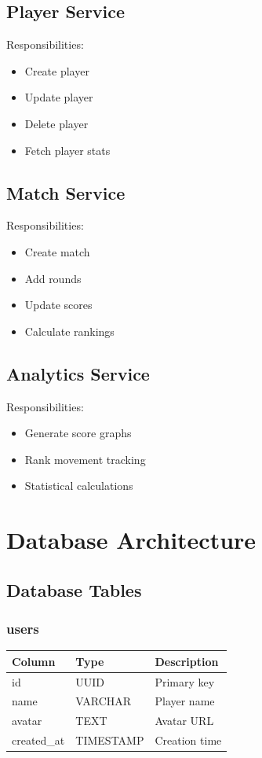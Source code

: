\documentclass[11pt,a4paper]{article}
\begin{document}
\subsection{Player Service}
Responsibilities:
\begin{itemize}
    \item Create player
    \item Update player
    \item Delete player
    \item Fetch player stats
\end{itemize}

\subsection{Match Service}
Responsibilities:
\begin{itemize}
    \item Create match
    \item Add rounds
    \item Update scores
    \item Calculate rankings
\end{itemize}

\subsection{Analytics Service}
Responsibilities:
\begin{itemize}
    \item Generate score graphs
    \item Rank movement tracking
    \item Statistical calculations
\end{itemize}

\section{Database Architecture}

\subsection{Database Tables}

\subsubsection{users}

\begin{longtable}{|p{4cm}|p{4cm}|p{5cm}|}
\hline
Column & Type & Description \\
\hline
id & UUID & Primary key \\
\hline
name & VARCHAR & Player name \\
\hline
avatar & TEXT & Avatar URL \\
\hline
created\_at & TIMESTAMP & Creation time \\
\hline
\end{longtable}
\end{document}
